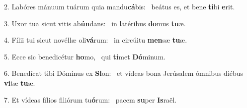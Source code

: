 2. Labóres mánuum tuárum quia mandu\textbf{cá}bis: \ast\  beátus es, et bene \textbf{ti}bi \textbf{e}rit.\

3. Uxor tua sicut vitis ab\textbf{ún}dans: \ast\  in latéribus \textbf{do}mus \textbf{tu}æ.\

4. Fílii tui sicut novéllæ oli\textbf{vá}rum: \ast\  in circúitu \textbf{men}sæ \textbf{tu}æ.\

5. Ecce sic benedicétur \textbf{ho}mo, \ast\  qui \textbf{ti}met \textbf{Dó}minum.\

6. Benedícat tibi Dóminus ex \textbf{Si}on: \ast\  et vídeas bona Jerúsalem ómnibus diébus \textbf{vi}tæ \textbf{tu}æ.\

7. Et vídeas fílios filiórum tu\textbf{ó}rum: \ast\  pacem \textbf{su}per \textbf{Is}raël.\

